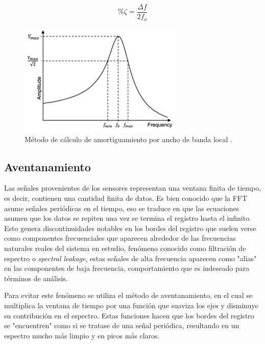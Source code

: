 \begin{itemize}
    \begin{equation}
        \%\zeta = \frac{\Delta f}{2f_o}
    \end{equation}
    
    \begin{figure}[H]
        \centering
        \includegraphics[width = 0.7\textwidth]{imagenes/cap1_marcoteo/Half-power-bandwidth-method.png}
        \caption{Método de cálculo de amortiguamiento por ancho de banda local \citep{potenciamitad2019}.}
        \label{fig:potenciamitad}
    \end{figure}
\end{itemize}


\subsection{Aventanamiento} Las señales provenientes de los sensores representan una ventana finita de tiempo, es decir, contienen una cantidad finita de datos. Es bien conocido que la FFT asume señales periódicas en el tiempo, eso se traduce en que las ecuaciones asumen que los datos se repiten una vez se termina el registro hasta el infinito. Esto genera discontinuidades notables en los bordes del registro que suelen verse como componentes frecuenciales que aparecen alrededor de las frecuencias naturales reales del sistema en estudio, fenómeno conocido como filtración de espectro o \textit{spectral leakage}, estas señales de alta frecuencia aparecen como "alias" en las componentes de baja frecuencia, comportamiento que es indeseado para términos de análisis.

Para evitar este fenómeno se utiliza el método de aventanamiento, en el cual se multiplica la ventana de tiempo por una función que suaviza los ejes y disminuye su contribución en el espectro. Estas funciones hacen que los bordes del registro se "encuentren" como si se tratase de una señal periódica, resultando en un espectro mucho más limpio y en picos más claros.

